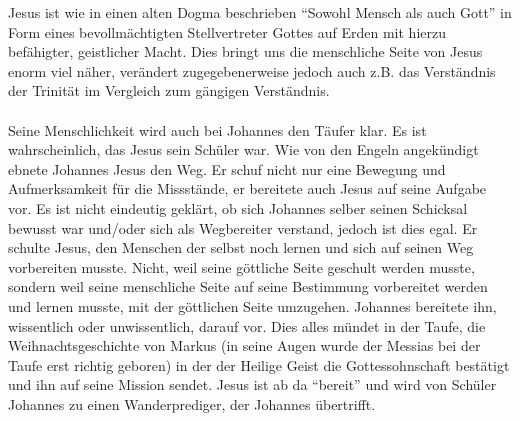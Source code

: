 Jesus ist wie in einen alten Dogma beschrieben ``Sowohl Mensch als auch Gott'' in Form eines bevollmächtigten Stellvertreter Gottes auf Erden mit hierzu befähigter, geistlicher Macht. Dies bringt uns die menschliche Seite von Jesus enorm viel näher, verändert zugegebenerweise jedoch auch z.B. das Verständnis der Trinität im Vergleich zum gängigen Verständnis.
\\~\\
Seine Menschlichkeit wird auch bei Johannes den Täufer klar. Es ist wahrscheinlich, das Jesus sein Schüler war. Wie von den Engeln angekündigt ebnete Johannes Jesus den Weg. Er schuf nicht nur eine Bewegung und Aufmerksamkeit für die Missstände, er bereitete auch Jesus auf seine Aufgabe vor. Es ist nicht eindeutig geklärt, ob sich Johannes selber seinen Schicksal bewusst war und/oder sich als Wegbereiter verstand, jedoch ist dies egal. Er schulte Jesus, den Menschen der selbst noch lernen und sich auf seinen Weg vorbereiten musste. Nicht, weil seine göttliche Seite geschult werden musste, sondern weil seine menschliche Seite auf seine Bestimmung vorbereitet werden und lernen musste, mit der göttlichen Seite umzugehen. Johannes bereitete ihn, wissentlich oder unwissentlich, darauf vor. Dies alles mündet in der Taufe, die Weihnachtsgeschichte von Markus (in seine Augen wurde der Messias bei der Taufe erst richtig geboren) in der der Heilige Geist die Gottessohnschaft bestätigt und ihn auf seine Mission sendet. Jesus ist ab da ``bereit'' und wird von Schüler Johannes zu einen Wanderprediger, der Johannes übertrifft.

